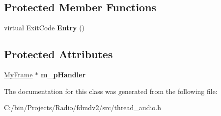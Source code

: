 \subsection*{Protected Member Functions}
\begin{DoxyCompactItemize}
\item 
\hypertarget{class_my_thread_a4d6a8787272aa070fdb1738110333e8c}{virtual Exit\-Code {\bfseries Entry} ()}\label{class_my_thread_a4d6a8787272aa070fdb1738110333e8c}

\end{DoxyCompactItemize}
\subsection*{Protected Attributes}
\begin{DoxyCompactItemize}
\item 
\hypertarget{class_my_thread_a784223b4cc5897c86dcfb3c417f081c0}{\hyperlink{class_my_frame}{My\-Frame} $\ast$ {\bfseries m\-\_\-p\-Handler}}\label{class_my_thread_a784223b4cc5897c86dcfb3c417f081c0}

\end{DoxyCompactItemize}


The documentation for this class was generated from the following file\-:\begin{DoxyCompactItemize}
\item 
C\-:/bin/\-Projects/\-Radio/fdmdv2/src/thread\-\_\-audio.\-h\end{DoxyCompactItemize}
